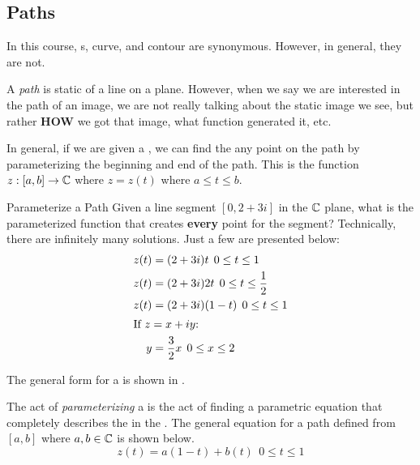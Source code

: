 \subsection{Paths}\label{subsec:Paths}
In this course, s, curve, and contour are synonymous.
However, in general, they are not.

\begin{definition}[Path]\label{def:Path}
  A \emph{path} is static  of a line on a plane.
  However, when we say we are interested in the path of an image, we are not really talking about the static image we see, but rather \textbf{HOW} we got that image, what function generated it, etc.
\end{definition}

In general, if we are given a , we can find the any point on the path by parameterizing the beginning and end of the path.
This is the function $z: [a, b] \to \operatorname{\mathbb{C}}$ where $z = z(t)$ where $a \leq t \leq b$.

\begin{example}{Parameterize a Path}
  Given a line segment $[0, 2+3i]$ in the $\operatorname{\mathbb{C}}$ plane, what is the parameterized function that creates \textbf{every} point for the segment?
  \tcblower{}
  Technically, there are infinitely many solutions.
  Just a few are presented below:
  \begin{align*}
    z(t) &= (2 + 3i)t \:\: 0 \leq t \leq 1 \\
    z(t) &= (2 + 3i)2t \:\: 0 \leq t \leq \frac{1}{2} \\
    z(t) &= (2 + 3i)(1-t) \:\: 0 \leq t \leq 1 \\
    \shortintertext{If $z = x + iy$:}
    y &= \frac{3}{2} x \:\: 0 \leq x \leq 2
  \end{align*}
\end{example}

The general form for  a  is shown in .

\begin{definition}[Parameterizing]\label{def:Parameterizing_Path}
  The act of \emph{parameterizing} a  is the act of finding a parametric equation that completely describes the  in the .
  The general equation for a path defined from $[a, b]$ where $a, b \in \operatorname{\mathbb{C}}$ is shown below.
  \begin{equation}\label{eq:Parameterizing_Path}
    z(t) = a(1-t) + b(t) \:\: 0 \leq t \leq 1
  \end{equation}
\end{definition}

